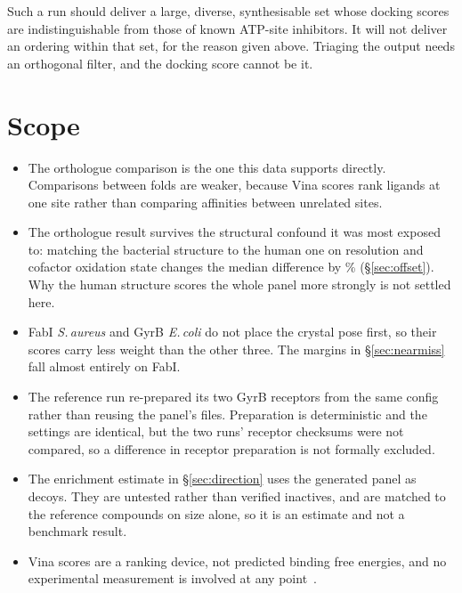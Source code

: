 \documentclass[11pt,a4paper]{article}
\begin{document}
Such a run should deliver a large, diverse, synthesisable set whose docking
scores are indistinguishable from those of known ATP-site inhibitors. It will
not deliver an ordering within that set, for the reason given above. Triaging
the output needs an orthogonal filter, and the docking score cannot be it.

\section{Scope}
\label{sec:scope}

\begin{itemize}\setlength{\itemsep}{0.2em}
\item The orthologue comparison is the one this data supports directly.
Comparisons between folds are weaker, because Vina scores rank ligands at one
site rather than comparing affinities between unrelated sites.
\item The orthologue result survives the structural confound it was most
exposed to: matching the bacterial structure to the human one on resolution
and cofactor oxidation state changes the median difference by \offsetPct\%
(\S\ref{sec:offset}). Why the human structure scores the whole panel more
strongly is not settled here.
\item FabI \textit{S.\,aureus} and GyrB \textit{E.\,coli} do not place the
crystal pose first, so their scores carry less weight than the other three.
The margins in \S\ref{sec:nearmiss} fall almost entirely on FabI.
\item The reference run re-prepared its two GyrB receptors from the same
config rather than reusing the panel's files. Preparation is deterministic
and the settings are identical, but the two runs' receptor checksums were not
compared, so a difference in receptor preparation is not formally excluded.
\item The enrichment estimate in \S\ref{sec:direction} uses the generated
panel as decoys. They are untested rather than verified inactives, and are
matched to the reference compounds on size alone, so it is an estimate and
not a benchmark result.
\item Vina scores are a ranking device, not predicted binding free energies,
and no experimental measurement is involved at any point~\cite{warren2006}.
\end{itemize}
\end{document}
